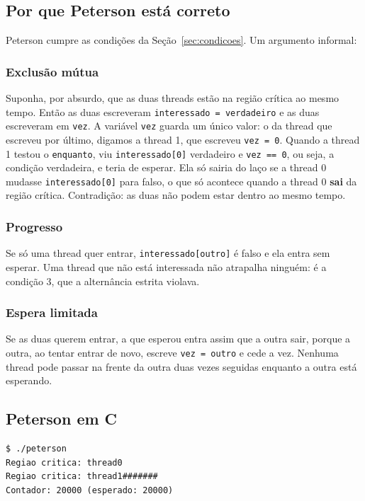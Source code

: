 \documentclass[11pt,a4paper]{article}
\newcommand{\raiz}{../../../..}
\newcommand{\cmd}[1]{\texttt{#1}}
\begin{document}
\subsection{Por que Peterson está correto}

Peterson cumpre as condições da Seção~\ref{sec:condicoes}. Um argumento informal:

\subsubsection{Exclusão mútua}
Suponha, por absurdo, que as duas threads estão na região crítica ao mesmo tempo. Então as duas escreveram \cmd{interessado = verdadeiro} e as duas escreveram em \cmd{vez}. A variável \cmd{vez} guarda um único valor: o da thread que escreveu por último, digamos a thread 1, que escreveu \cmd{vez = 0}. Quando a thread 1 testou o \cmd{enquanto}, viu \cmd{interessado[0]} verdadeiro e \cmd{vez == 0}, ou seja, a condição verdadeira, e teria de esperar. Ela só sairia do laço se a thread 0 mudasse \cmd{interessado[0]} para falso, o que só acontece quando a thread 0 \textbf{sai} da região crítica. Contradição: as duas não podem estar dentro ao mesmo tempo.

\subsubsection{Progresso}
Se só uma thread quer entrar, \cmd{interessado[outro]} é falso e ela entra sem esperar. Uma thread que não está interessada não atrapalha ninguém: é a condição 3, que a alternância estrita violava.

\subsubsection{Espera limitada}
Se as duas querem entrar, a que esperou entra assim que a outra sair, porque a outra, ao tentar entrar de novo, escreve \cmd{vez = outro} e cede a vez. Nenhuma thread pode passar na frente da outra duas vezes seguidas enquanto a outra está esperando.

\subsection{Peterson em C}



\begin{lstlisting}[style=terminal]
$ ./peterson
Regiao critica: thread0
Regiao critica: thread1#######
Contador: 20000 (esperado: 20000)
\end{lstlisting}
\end{document}
